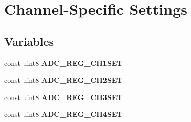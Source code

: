 \hypertarget{group___chn_set}{\section{Channel-\/\-Specific Settings}
\label{group___chn_set}
}
\subsection*{Variables}
\begin{DoxyCompactItemize}
\item 
\hypertarget{group___chn_set_ga8712941d8ab6c0e5b967d86a42557262}{const uint8 {\bfseries A\-D\-C\-\_\-\-R\-E\-G\-\_\-\-C\-H1\-S\-E\-T}}\label{group___chn_set_ga8712941d8ab6c0e5b967d86a42557262}

\item 
\hypertarget{group___chn_set_ga7952ce89ba925eb4e79f933b2880c10e}{const uint8 {\bfseries A\-D\-C\-\_\-\-R\-E\-G\-\_\-\-C\-H2\-S\-E\-T}}\label{group___chn_set_ga7952ce89ba925eb4e79f933b2880c10e}

\item 
\hypertarget{group___chn_set_ga143c1213507186b58b141e456f586c62}{const uint8 {\bfseries A\-D\-C\-\_\-\-R\-E\-G\-\_\-\-C\-H3\-S\-E\-T}}\label{group___chn_set_ga143c1213507186b58b141e456f586c62}

\item 
\hypertarget{group___chn_set_ga92ce09656a4b6a177879b026e3369c2c}{const uint8 {\bfseries A\-D\-C\-\_\-\-R\-E\-G\-\_\-\-C\-H4\-S\-E\-T}}\label{group___chn_set_ga92ce09656a4b6a177879b026e3369c2c}


\end{DoxyCompactItemize}
